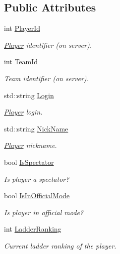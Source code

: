 \subsection*{Public Attributes}
\begin{DoxyCompactItemize}
\item 
int \hyperlink{structPlayer_a6a71d7d9837a0a12e52ca47930965e0f}{Player\-Id}
\begin{DoxyCompactList}\small\item\em \hyperlink{structPlayer}{Player} identifier (on server). \end{DoxyCompactList}\item 
int \hyperlink{structPlayer_a350919664ba73d6d6cd6d03bd2a5cacd}{Team\-Id}
\begin{DoxyCompactList}\small\item\em Team identifier (on server). \end{DoxyCompactList}\item 
std\-::string \hyperlink{structPlayer_a38398818d43e186aa982a788744792d7}{Login}
\begin{DoxyCompactList}\small\item\em \hyperlink{structPlayer}{Player} login. \end{DoxyCompactList}\item 
std\-::string \hyperlink{structPlayer_a553cc1b0aa79108b511ba408210582cf}{Nick\-Name}
\begin{DoxyCompactList}\small\item\em \hyperlink{structPlayer}{Player} nickname. \end{DoxyCompactList}\item 
bool \hyperlink{structPlayer_a61ba0e32d336f5cd1eb152addf6848d2}{Is\-Spectator}
\begin{DoxyCompactList}\small\item\em Is player a spectator? \end{DoxyCompactList}\item 
bool \hyperlink{structPlayer_a76e8b5298bcbe9ff694b6ed490ef7ca5}{Is\-In\-Official\-Mode}
\begin{DoxyCompactList}\small\item\em Is player in official mode? \end{DoxyCompactList}\item 
int \hyperlink{structPlayer_a25fe69852f0e38f541ad615cd59877ef}{Ladder\-Ranking}
\begin{DoxyCompactList}\small\item\em Current ladder ranking of the player. \end{DoxyCompactList}\end{DoxyCompactItemize}


